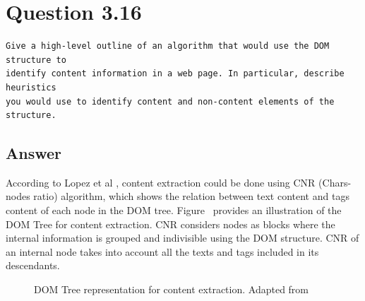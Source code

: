 \documentclass[letterpaper,11pt]{article}
\begin{document}
\noindent\makebox[\linewidth]{\rule{\textwidth}{0.4pt}}


\section*{Question 3.16}
\begin{verbatim}
Give a high-level outline of an algorithm that would use the DOM structure to
identify content information in a web page. In particular, describe heuristics
you would use to identify content and non-content elements of the structure.
\end{verbatim}

\subsection*{Answer}

According to Lopez et al \cite{lopez2012using}, content extraction could be done using CNR (Chars-nodes ratio) algorithm, which shows the relation between text content and tags content of each node in the DOM tree. Figure \ provides an illustration of the DOM Tree for content extraction. CNR considers nodes as blocks where the internal information is grouped and indivisible using the DOM structure. CNR of an internal node takes into account all the texts and tags included in its descendants. 

\begin{figure}[H]

	\centering

	\caption{DOM Tree representation for content extraction. Adapted from \cite{lopez2012using}}

	\label{fig:dom_tree}
\end{figure}
\end{document}
